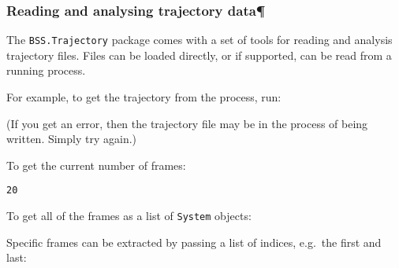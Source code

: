 \hypertarget{reading-and-analysing-trajectory-data}{%
\subsubsection{Reading and analysing trajectory
data¶}\label{reading-and-analysing-trajectory-data}}

The \texttt{BSS.Trajectory} package comes with a set of tools for
reading and analysis trajectory files. Files can be loaded directly, or
if supported, can be read from a running process.

For example, to get the trajectory from the process, run:

\begin{Shaded}
\begin{Highlighting}[]
\OperatorTok{=}
\end{Highlighting}
\end{Shaded}

(If you get an error, then the trajectory file may be in the process of
being written. Simply try again.)

To get the current number of frames:

\begin{Shaded}
\begin{Highlighting}[]
\end{Highlighting}
\end{Shaded}

\begin{verbatim}
20
\end{verbatim}

To get all of the frames as a list of \texttt{System} objects:

\begin{Shaded}
\begin{Highlighting}[]
\OperatorTok{=}
\end{Highlighting}
\end{Shaded}

Specific frames can be extracted by passing a list of indices, e.g.~the
first and last:

\begin{Shaded}
\begin{Highlighting}[]
\OperatorTok{=}\NormalTok{ traj.getFrames([}\NormalTok{, }\NormalTok{])}
\end{Highlighting}
\end{Shaded}

